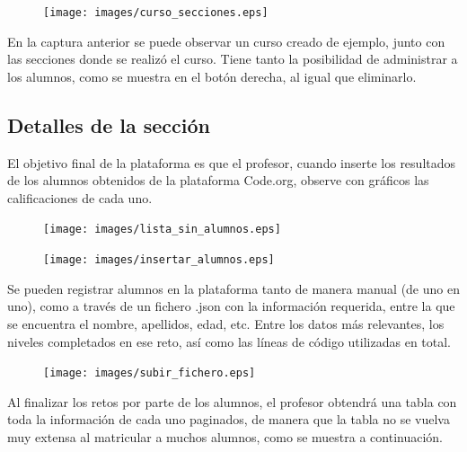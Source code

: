 \begin{figure}[!th]
\begin{center}
\texttt{[image: images/curso\_secciones.eps]}
\label{fig:17}
\end{center}
\end{figure}

En la captura anterior se puede observar un curso creado de ejemplo, junto con las secciones donde se realizó el curso. Tiene tanto la posibilidad de administrar a los alumnos, como se muestra en el botón derecha, al igual que eliminarlo.


\newpage
\subsection{Detalles de la sección}
\label{1:sec:6}

El objetivo final de la plataforma es que el profesor, cuando inserte los resultados de los alumnos obtenidos de la plataforma Code.org, observe con gráficos las calificaciones de cada uno.

\begin{figure}[!th]
\begin{center}
\texttt{[image: images/lista\_sin\_alumnos.eps]}
\label{fig:18}
\end{center}
\end{figure}

\begin{figure}[!th]
\begin{center}
\texttt{[image: images/insertar\_alumnos.eps]}
\label{fig:19}
\end{center}
\end{figure}

Se pueden registrar alumnos en la plataforma tanto de manera manual (de uno en uno), como a través de un fichero .json con la información requerida, entre la que se encuentra el nombre, apellidos, edad, etc. Entre los datos más relevantes,
los niveles completados en ese reto, así como las líneas de código utilizadas en total.

\begin{figure}[!th]
\begin{center}
\texttt{[image: images/subir\_fichero.eps]}
\label{fig:20}
\end{center}
\end{figure}

\newpage
Al finalizar los retos por parte de los alumnos, el profesor obtendrá una tabla con toda la información de cada uno paginados, de manera que la tabla no se vuelva muy extensa al matricular a muchos alumnos, como se muestra a continuación.

